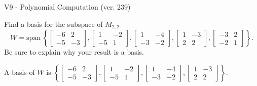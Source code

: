 \begin{exercise}
  \begin{exerciseTitle}V9 - Polynomial Computation (ver. 239)\end{exerciseTitle}
  \begin{exerciseStatement}
    Find a basis for the subspace of \(M_{2,2}\) 
\[W=\mathrm{span}\ \left\{\left[\begin{array}{cc}
-6 & 2 \\
-5 & -3
\end{array}\right] , \left[\begin{array}{cc}
1 & -2 \\
-5 & 1
\end{array}\right] , \left[\begin{array}{cc}
1 & -4 \\
-3 & -2
\end{array}\right] , \left[\begin{array}{cc}
1 & -3 \\
2 & 2
\end{array}\right] , \left[\begin{array}{cc}
-3 & 2 \\
-2 & 1
\end{array}\right]\right\}.\]
 Be sure to explain why your result is a basis.


  \end{exerciseStatement}
  \begin{exerciseAnswer}
   A basis of \(W\) is  \(\left\{\left[\begin{array}{cc}
-6 & 2 \\
-5 & -3
\end{array}\right] , \left[\begin{array}{cc}
1 & -2 \\
-5 & 1
\end{array}\right] , \left[\begin{array}{cc}
1 & -4 \\
-3 & -2
\end{array}\right] , \left[\begin{array}{cc}
1 & -3 \\
2 & 2
\end{array}\right]\right\}\).
  


  \end{exerciseAnswer}
\end{exercise}